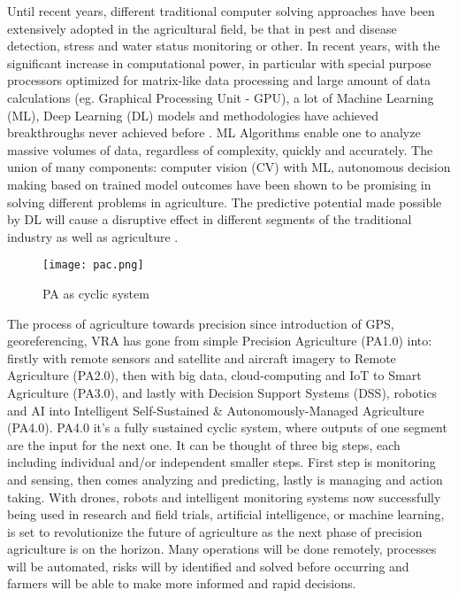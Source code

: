\documentclass[review]{elsarticle}
\begin{document}
Until recent years, different traditional computer solving approaches have been extensively adopted in the agricultural field, be that in pest and disease detection, stress and water status monitoring or other. In recent years, with the significant increase in computational power, in particular with special purpose processors optimized for matrix-like data processing and large amount of data calculations (eg. Graphical Processing Unit - GPU), a lot of Machine Learning (ML), Deep Learning (DL) models and methodologies have achieved breakthroughs never achieved before \cite{LeCun2015, Ensmenger_2011}. ML Algorithms enable one to analyze massive volumes of data, regardless of complexity, quickly and accurately. The union of many components: computer vision (CV) with ML, autonomous decision making based on trained model outcomes have been shown to be promising in solving different problems in agriculture. The predictive potential made possible by DL will cause a disruptive effect in different segments of the traditional industry as well as agriculture \cite{Patr_cio_2018}.

\begin{figure}[thpb]
    \centering
    \texttt{[image: pac.png]}
    \caption{PA as cyclic system}
    \label{fig:pac}
\end{figure}

The process of agriculture towards precision since introduction of GPS, georeferencing, VRA has gone from simple Precision Agriculture (PA1.0) into: firstly with remote sensors and satellite and aircraft imagery to Remote Agriculture (PA2.0), then with big data, cloud-computing and IoT to Smart Agriculture (PA3.0), and lastly with Decision Support Systems (DSS), robotics and AI into Intelligent Self-Sustained \& Autonomously-Managed Agriculture (PA4.0). PA4.0 it's a fully sustained cyclic system, where outputs of one segment are the input for the next one. It can be thought of three big steps, each including individual and/or independent smaller steps. First step is monitoring and sensing, then comes analyzing and predicting, lastly is managing and action taking. With drones, robots and intelligent monitoring systems now successfully being used in research and field trials, artificial intelligence, or machine learning, is set to revolutionize the future of agriculture as the next phase of precision agriculture is on the horizon. Many operations will be done remotely, processes will be automated, risks will by identified and solved before occurring and farmers will be able to make more informed and rapid decisions.
\end{document}
